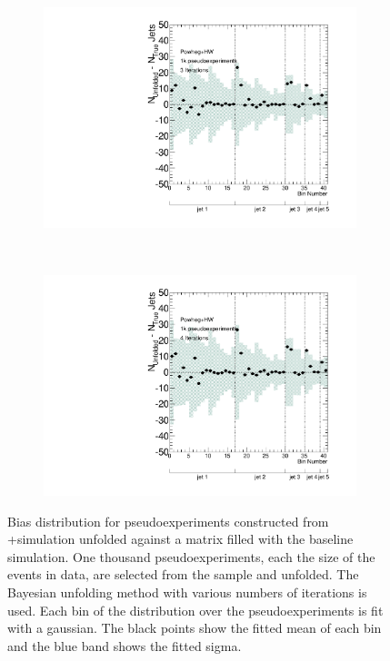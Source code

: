 \begin{figure}
\begin{subfigure}[]{0.5\textwidth}
\end{subfigure}
\\
\begin{subfigure}[]{0.5\textwidth}
\includegraphics[width=\textwidth]{fig/Stress/105860atlfast/Bias3Iterations.pdf}
\end{subfigure}
~
\begin{subfigure}[]{0.5\textwidth}
\includegraphics[width=\textwidth]{fig/Stress/105860atlfast/Bias4Iterations.pdf}
\end{subfigure}

\caption{Bias distribution for pseudoexperiments constructed from \pow+\hw \newline simulation unfolded against a matrix filled with the baseline simulation. One thousand pseudoexperiments, each the size of the events in data, are selected from the sample and unfolded. The Bayesian unfolding method with various numbers of iterations is used. Each bin of the distribution over the pseudoexperiments is fit with a gaussian. The black points show the fitted mean of each bin and the blue band shows the fitted sigma. }
\label{fig:powhwbias}
\end{figure}

